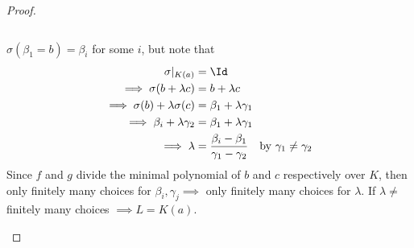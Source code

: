 \begin{proof}
\begin{itemize}
\[		      \]
		      \begin{note}
			      \( \sigma(\beta_1 = b) = \beta_i \) for some \( i \), but note that
			      \[
				      \begin{aligned}
					      \sigma|_{K(a)}                         & = \Id                                                               \\
					      \implies \sigma(b + \lambda c)         & =
					      b + \lambda  c                                                                                               \\
					      \implies \sigma(b) + \lambda \sigma(c) & = \beta_1 + \lambda \gamma_1                                        \\
					      \implies \beta_i + \lambda \gamma_2    & = \beta_1 + \lambda \gamma_1                                        \\
					      \implies \lambda                       & = \frac{\beta _i -\beta _1}{\gamma _1 - \gamma _2} \quad \text{by }
					      \gamma _1 \ne \gamma _2
				      \end{aligned}
			      \]
			      Since \( f \) and \( g \) divide the minimal polynomial of \( b \) and \( c \) respectively
			      over \( K \), then only finitely many choices for \( \beta_i, \gamma_j \implies \) only
			      finitely many choices for \( \lambda \). If \( \lambda \ne  \) finitely many choices \(
			      \implies  L = K(a) \).
		      \end{note}
	\end{itemize}
\end{proof}

